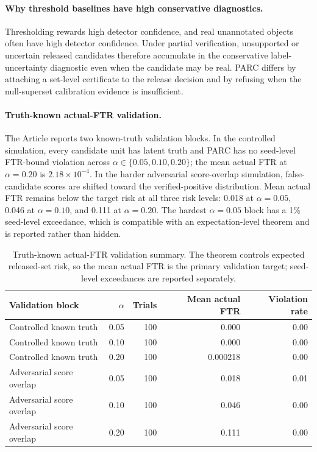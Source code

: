 \documentclass[11pt]{article}
\begin{document}
\paragraph{Why threshold baselines have high conservative diagnostics.}
Thresholding rewards high detector confidence, and real unannotated objects often have high detector confidence.
Under partial verification, unsupported or uncertain released candidates therefore accumulate in the conservative label-uncertainty diagnostic even when the candidate may be real.
PARC differs by attaching a set-level certificate to the release decision and by refusing when the null-superset calibration evidence is insufficient.

\paragraph{Truth-known actual-FTR validation.}
The Article reports two known-truth validation blocks.
In the controlled simulation, every candidate unit has latent truth and PARC has no seed-level FTR-bound violation across \(\alpha\in\{0.05,0.10,0.20\}\); the mean actual FTR at \(\alpha=0.20\) is \(2.18\times10^{-4}\).
In the harder adversarial score-overlap simulation, false-candidate scores are shifted toward the verified-positive distribution.
Mean actual FTR remains below the target risk at all three risk levels: 0.018 at \(\alpha=0.05\), 0.046 at \(\alpha=0.10\), and 0.111 at \(\alpha=0.20\).
The hardest \(\alpha=0.05\) block has a 1\% seed-level exceedance, which is compatible with an expectation-level theorem and is reported rather than hidden.

\begin{table}[h]
\centering
\caption{Truth-known actual-FTR validation summary. The theorem controls expected released-set risk, so the mean actual FTR is the primary validation target; seed-level exceedances are reported separately.}
\small
\begin{tabular}{lrrrr}
\toprule
Validation block & \(\alpha\) & Trials & Mean actual FTR & Violation rate \\
\midrule
Controlled known truth & 0.05 & 100 & 0.000 & 0.00 \\
Controlled known truth & 0.10 & 100 & 0.000 & 0.00 \\
Controlled known truth & 0.20 & 100 & 0.000218 & 0.00 \\
Adversarial score overlap & 0.05 & 100 & 0.018 & 0.01 \\
Adversarial score overlap & 0.10 & 100 & 0.046 & 0.00 \\
Adversarial score overlap & 0.20 & 100 & 0.111 & 0.00 \\
\bottomrule
\end{tabular}
\end{table}
\end{document}
